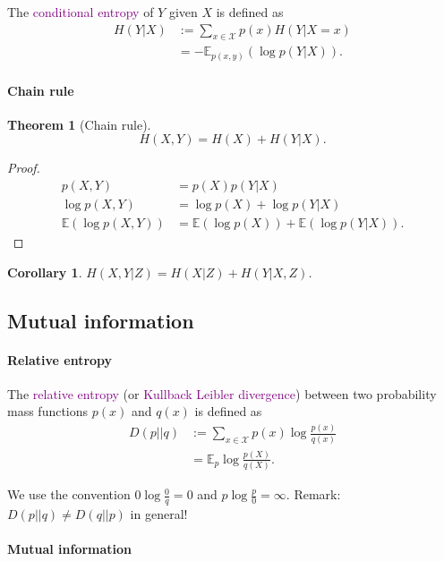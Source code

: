 \documentclass[a4paper, 11pt, openany]{book}
\numberwithin{equation}{section}
\theoremstyle{plain}
\newtheorem{theorem}	[equation]	{Theorem}
\newtheorem{corollary}	[equation]	{Corollary}
\theoremstyle{definition}
\newcommand{\expectation}{\mathbb{E}}
\newcommand{\Define}[1]{\textcolor{purple}{#1}}
\newcommand{\alphabet}[1]{\mathcal{#1}}
\begin{document}
The \Define{conditional entropy} of $Y$ given $X$ is defined as
\begin{align*}
	H(Y|X) &:= \sum_{x \in \alphabet{X}} p(x) H(Y|X=x)\\
	&= -\expectation_{p(x,y)} \left( \log p(Y|X) \right).
\end{align*}


\paragraph{Chain rule}
\begin{theorem}[Chain rule]
\[
	H(X,Y) = H(X) + H(Y|X).
\]
\end{theorem}

\begin{proof}
\begin{align*}
	p(X,Y) &= p(X) p(Y|X)\\
	\log p(X,Y) &= \log p(X) + \log p(Y|X)\\
	\expectation ( \log p(X,Y) ) &= \expectation ( \log p(X) ) + \expectation (\log p(Y|X)).
\end{align*}
\end{proof}

\begin{corollary}
$H(X,Y|Z) = H(X|Z) + H(Y|X,Z)$.
\end{corollary}




\subsection{Mutual information}


\paragraph{Relative entropy}


The \Define{relative entropy} (or \Define{Kullback Leibler divergence}) between two probability mass functions $p(x)$ and $q(x)$ is defined as
\begin{align*}
	D(p||q) &:= \sum_{x \in \alphabet{X}} p(x) \log \frac{p(x)}{q(x)}\\
	&= \expectation_p \log\frac{p(X)}{q(X)}.
\end{align*}

We use the convention $0 \log \frac{0}{q} = 0$ and $p \log \frac{p}{0} = \infty$. Remark: $D(p||q) \ne D(q||p)$ in general!



\paragraph{Mutual information}
\end{document}
